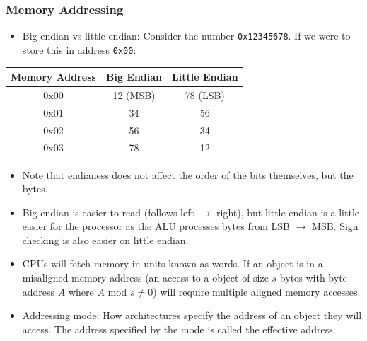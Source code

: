\subsubsection{Memory Addressing}
\begin{itemize}
  \item Big endian vs little endian: Consider the number \texttt{0x12345678}. If we were to store this in address \texttt{0x00}:
\end{itemize}
\begin{center}
\begin{tabular} {c c c}
\hline 
Memory Address & Big Endian & Little Endian \\
\hline 
\hline 
0x00 & 12 (MSB) & 78 (LSB) \\
0x01 & 34 & 56 \\
0x02 & 56 & 34 \\ 
0x03 & 78 & 12 \\
\hline
\end{tabular}
\end{center}
\begin{itemize}
  \item Note that endianess does not affect the order of the bits themselves, but the bytes.
  \item Big endian is easier to read (follows left $\rightarrow$ right), but little endian is a little easier for the processor as the ALU processes bytes from LSB $\rightarrow$ MSB. Sign checking is also easier on little endian.
  \item CPUs will fetch memory in units known as words. If an object is in a misaligned memory address (an access to a object of size $s$ bytes with byte address $A$ where $A$ mod $s \neq 0$) will require multiple aligned memory accesses.
  \item Addressing mode: How architectures specify the address of an object they will access. The address specified by the mode is called the effective address.
\end{itemize}
